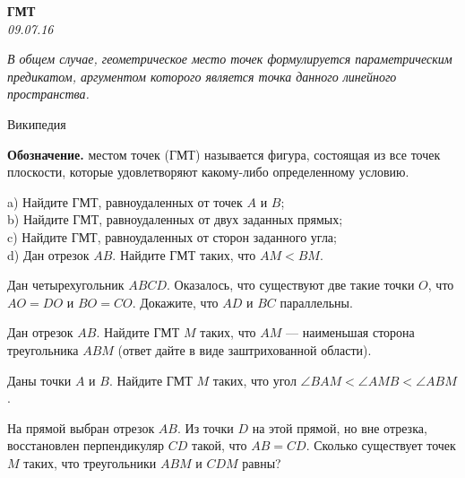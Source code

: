 \begin{center}
\textbf{\Large ГМТ}\\
\textit{09.07.16}
\end{center}

\epigraph{\it В общем случае, геометрическое место точек формулируется параметрическим предикатом, аргументом которого является точка данного линейного пространства.}{Википедия}

\textbf{Обозначение.} { местом точек (ГМТ)} называется фигура, состоящая из все точек плоскости, которые удовлетворяют какому-либо определенному условию.




\begin{problems}

\item   a) Найдите ГМТ, равноудаленных от точек $A$ и $B$;\\
b) Найдите ГМТ, равноудаленных от двух заданных прямых;\\
c) Найдите ГМТ, равноудаленных от сторон заданного угла;\\
d) Дан отрезок $AB$. Найдите ГМТ таких, что $AM<BM$.


\item  Дан четырехугольник $ABCD$. Оказалось, что существуют две такие точки $O$, что $AO=DO$ и $BO=CO$. Докажите, что $AD$ и $BC$ параллельны.

\item  Дан отрезок $AB$.  Найдите ГМТ $M$ таких, что $AM$ --- наименьшая сторона треугольника $ABM$ (ответ дайте в виде заштрихованной области).

\item   Даны точки $A$ и $B$. Найдите ГМТ $M$ таких, что угол $ \angle BAM< \angle AMB < \angle ABM$.


\item   На прямой выбран отрезок $AB$. Из точки $D$ на этой прямой, но вне отрезка, восстановлен перпендикуляр $CD$ такой, что $AB=CD$. Сколько существует точек $M$ таких, что треугольники $ABM$ и $CDM$ равны?


\end{problems}
